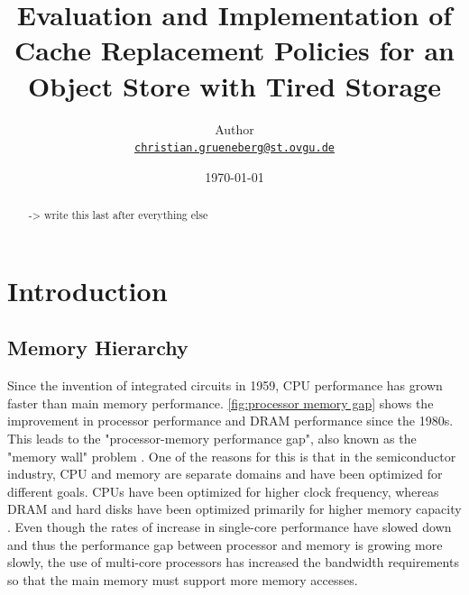 \documentclass[
	12pt,
	a4paper,
	abstract,
	bibliography=totoc,
	chapterprefix,
	headings=openright,
	numbers=endperiod,
	parskip=half,
	twoside,
]{scrreprt}
\title{Evaluation and Implementation of Cache Replacement Policies for an Object Store with Tired Storage}
\author{
Author\\
{\large\href{mailto:christian.grueneberg@st.ovgu.de}{\nolinkurl{christian.grueneberg@st.ovgu.de}}}
}
\date{\today}
\begin{document}
{}

\maketitle

\begin{abstract}


-> write this last after everything else

\end{abstract}

\tableofcontents

\cleardoubleoddpage
{}

\chapter{Introduction}
\label{cha:introduction}



\section{Memory Hierarchy}
Since the invention of integrated circuits in 1959, CPU performance has grown faster than main memory performance.
\cref{fig:processor memory gap} shows the improvement in processor performance and DRAM performance since the 1980s.
This leads to the "processor-memory performance gap", also known as the "memory wall" problem \cite{wulf1995hitting}.
One of the reasons for this is that in the semiconductor industry, CPU and memory are separate domains and have been optimized for different goals.
CPUs have been optimized for higher clock frequency, whereas DRAM and hard disks have been optimized primarily for higher memory capacity \cite{cpu-mem-gap}.
Even though the rates of increase in single-core performance have slowed down and thus the performance gap between processor and memory is growing more slowly, the use of multi-core processors has increased the bandwidth requirements so that the main memory must support more memory accesses.
\end{document}
